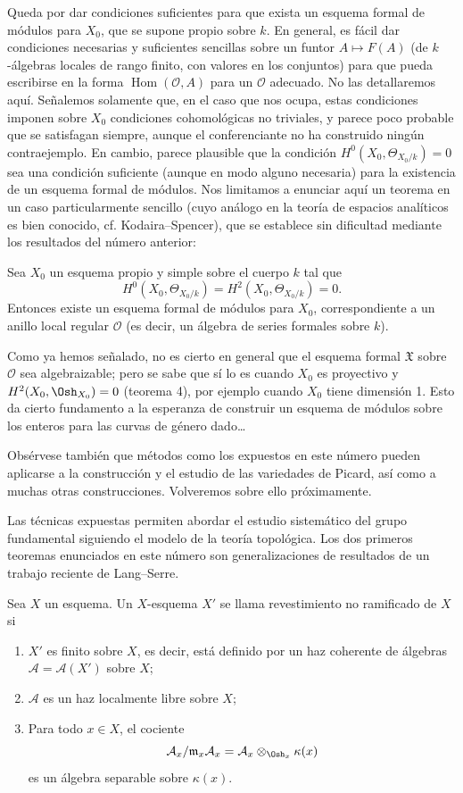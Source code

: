Queda por dar condiciones suficientes para que exista un esquema formal de
módulos para $X_0$, que se supone propio sobre $k$. En general, es fácil dar
condiciones necesarias y suficientes sencillas sobre un funtor
$A\longmapsto F(A)$ (de $k$-álgebras locales de rango finito, con valores en
los conjuntos) para que pueda escribirse en la forma
$\operatorname{Hom}(\mathcal O,A)$ para un $\mathcal O$ adecuado. No las
detallaremos aquí. Señalemos solamente que, en el caso que nos ocupa, estas
condiciones imponen sobre $X_0$ condiciones cohomológicas no triviales, y parece
poco probable que se satisfagan siempre, aunque el conferenciante no ha
construido ningún contraejemplo. En cambio, parece plausible que la condición
$H^0(X_0,\Theta_{X_0/k})=0$ sea una condición suficiente (aunque en modo alguno
necesaria) para la existencia de un esquema formal de módulos. Nos limitamos a
enunciar aquí un teorema en un caso particularmente sencillo (cuyo análogo en
la teoría de espacios analíticos es bien conocido, cf. Kodaira--Spencer), que se
establece sin dificultad mediante los resultados del número anterior:

 Sea $X_0$ un esquema propio y simple sobre el cuerpo $k$
tal que
\[
  H^0(X_0,\Theta_{X_0/k})=H^2(X_0,\Theta_{X_0/k})=0.
\]
Entonces existe un esquema formal de módulos para $X_0$, correspondiente a un
anillo local regular $\mathcal O$ (es decir, un álgebra de series formales sobre
$k$).

Como ya hemos señalado, no es cierto en general que el esquema formal
$\mathfrak X$ sobre $\mathcal O$ sea algebraizable; pero se sabe que sí lo es
cuando $X_0$ es proyectivo y $H^2(X_0,\Osh_{X_0})=0$ (teorema 4), por ejemplo
cuando $X_0$ tiene dimensión 1. Esto da cierto fundamento a la esperanza de
construir un esquema de módulos sobre los enteros para las curvas de género
dado\ldots{}

Obsérvese también que métodos como los expuestos en este número pueden aplicarse
a la construcción y el estudio de las variedades de Picard, así como a muchas
otras construcciones. Volveremos sobre ello próximamente.


Las técnicas expuestas permiten abordar el estudio sistemático del grupo
fundamental siguiendo el modelo de la teoría topológica. Los dos primeros
teoremas enunciados en este número son generalizaciones de resultados de un
trabajo reciente de Lang--Serre.

Sea $X$ un esquema. Un $X$-esquema $X'$ se llama revestimiento no ramificado de
$X$ si
\begin{enumerate}
  \item[\textit{i.}] $X'$ es finito sobre $X$, es decir, está definido por un
    haz coherente de álgebras $\mathcal A=\mathcal A(X')$ sobre $X$;
  \item[\textit{ii.}] $\mathcal A$ es un haz localmente libre sobre $X$;
  \item[\textit{iii.}] Para todo $x\in X$, el cociente
    \[
      \mathcal A_x/\mathfrak m_x\mathcal A_x
      =\mathcal A_x\otimes_{\Osh_x}\kappa(x)
    \]
    es un álgebra separable sobre $\kappa(x)$.
\end{enumerate}

